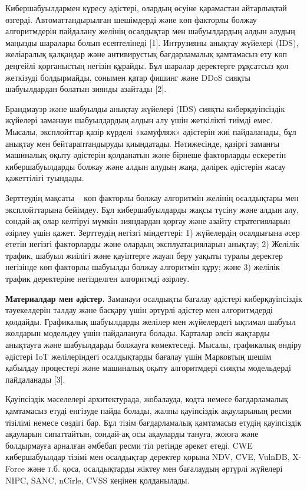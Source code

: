 \documentclass[
]{article}
\begin{document}
Кибершабуылдармен күресу әдістері, олардың өсуіне қарамастан айтарлықтай
өзгерді. Автоматтандырылған шешімдерді және көп факторлы болжау
алгоритмдерін пайдалану желінің осалдықтар мен шабуылдардың алдын алудың
маңызды шаралары болып есептелінеді {[}1{]}. Интрузияны анықтау жүйелері
(IDS), желіаралық қалқандар және антивирустық бағдарламалық қамтамасыз
ету көп деңгейлі қорғаныстың негізін құрайды. Бұл шаралар деректерге
рұқсатсыз қол жеткізуді болдырмайды, сонымен қатар фишинг және DDoS
сияқты шабуылдардан болатын зиянды азайтады {[}2{]}.

Брандмауэр және шабуылды анықтау жүйелері (IDS) сияқты киберқауіпсіздік
жүйелері заманауи шабуылдардың алдын алу үшін жеткілікті тиімді емес.
Мысалы, эксплойттар қазір күрделі «камуфляж» әдістерін жиі пайдаланады,
бұл анықтау мен бейтараптандыруды қиындатады. Нәтижесінде, қазіргі
заманғы машиналық оқыту әдістерін қолданатын және бірнеше факторларды
ескеретін кибершабуылдарды болжау және алдын алудың жаңа, дәлірек
әдістерін жасау қажеттілігі туындады.

Зерттеудің мақсаты -- көп факторлы болжау алгоритмін желінің осалдықтары
мен эксплойттарына бейімдеу. Бұл кибершабуылдарды жақсы түсіну және
алдын алу, сондай-ақ олар келтіруі мүмкін зияндардан қорғау және азайту
стратегияларын әзірлеу үшін қажет. Зерттеудің негізгі міндеттері: 1)
жүйелердің осалдығына әсер ететін негізгі факторларды және олардың
эксплуатацияларын анықтау; 2) Желілік трафик, шабуыл жиілігі және
қауіптерге жауап беру уақыты туралы деректер негізінде көп факторлы
шабуылды болжау алгоритмін құру; және 3) желілік трафик деректеріне
негізделген алгоритмді әзірлеу.

\textbf{Материалдар мен әдістер.} Заманауи осалдықты бағалау әдістері
киберқауіпсіздік тәуекелдерін талдау және басқару үшін әртүрлі әдістер
мен алгоритмдерді қолдайды. Графикалық шабуылдарды желілер мен
жүйелердегі ықтимал шабуыл жолдарын модельдеу үшін пайдалануға болады.
Карталар әлсіз жақтарды анықтауға және шабуылдарды болжауға көмектеседі.
Мысалы, графикалық өндіру әдістері IoT желілеріндегі осалдықтарды
бағалау үшін Марковтың шешім қабылдау процестері және машиналық оқыту
алгоритмдері сияқты модельдерді пайдаланады {[}3{]}.

Қауіпсіздік мәселелері архитектурада, жобалауда, кодта немесе
бағдарламалық қамтамасыз етуді енгізуде пайда болады, жалпы қауіпсіздік
ақауларының ресми тізілімі немесе сөздігі бар. Бұл тізім бағдарламалық
қамтамасыз етудің қауіпсіздік ақауларын сипаттайтын, сондай-ақ осы
ақауларды тануға, жоюға және болдырмауға арналған әмбебап ресми тіл
ретінде әрекет етеді. CWE кибершабуылдар тізімі мен осалдықтар деректер
қорына NDV, CVE, VulnDB, X-Force және т.б. қоса, осалдықтарды жіктеу мен
бағалаудың әртүрлі жүйелері NIPC, SANC, nCirle, CVSS кеңінен
қолданылады.
\end{document}
